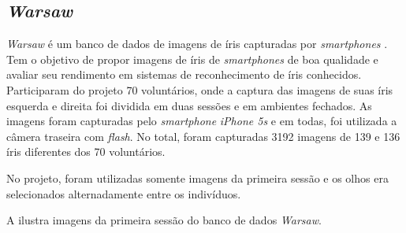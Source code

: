 \subsection{\textit{\acrshort{Warsaw}}}\label{sec:experimentos:db:warsaw}

\par \textit{\acrshort{Warsaw}} é um banco de dados de imagens de íris capturadas por \textit{smartphones} \cite{trokielwicz2016-Warsaw}. Tem o objetivo de propor imagens de íris de \textit{smartphones} de boa qualidade e avaliar seu rendimento em sistemas de reconhecimento de íris conhecidos. Participaram do projeto 70 voluntários, onde a captura das imagens de suas íris esquerda e direita foi dividida em duas sessões e em ambientes fechados. As imagens foram capturadas pelo \textit{smartphone} \textit{iPhone 5s} e em todas, foi utilizada a câmera traseira com \textit{flash}. No total, foram capturadas 3192 imagens de 139 e 136 íris diferentes dos 70 voluntários.

\par No projeto, foram utilizadas somente imagens da primeira sessão e os olhos era selecionados alternadamente entre os indivíduos.

\par A  ilustra imagens da primeira sessão do banco de dados \textit{\acrshort{Warsaw}}.


